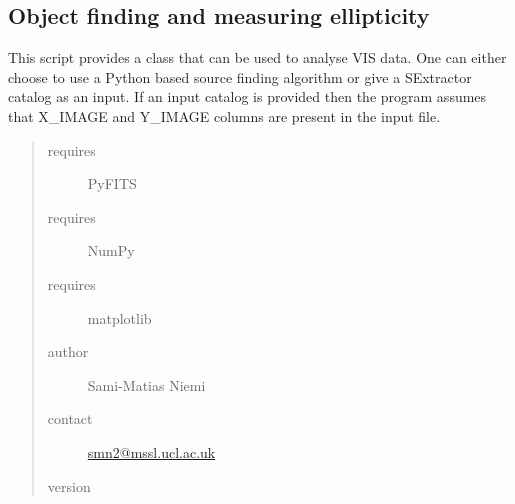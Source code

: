 \documentclass[a4paper,12pt,english]{sphinxmanual}
\begin{document}
\subsection{Object finding and measuring ellipticity}
\label{analysis:object-finding-and-measuring-ellipticity}
This script provides a class that can be used to analyse VIS data.
One can either choose to use a Python based source finding algorithm or
give a SExtractor catalog as an input. If an input catalog is provided
then the program assumes that X\_IMAGE and Y\_IMAGE columns are present
in the input file.
\begin{quote}\begin{description}
\item[{requires}] \leavevmode
PyFITS

\item[{requires}] \leavevmode
NumPy

\item[{requires}] \leavevmode
matplotlib

\item[{author}] \leavevmode
Sami-Matias Niemi

\item[{contact}] \leavevmode
\href{mailto:smn2@mssl.ucl.ac.uk}{smn2@mssl.ucl.ac.uk}

\item[{version}] 

\end{description}\end{quote}
\end{document}
